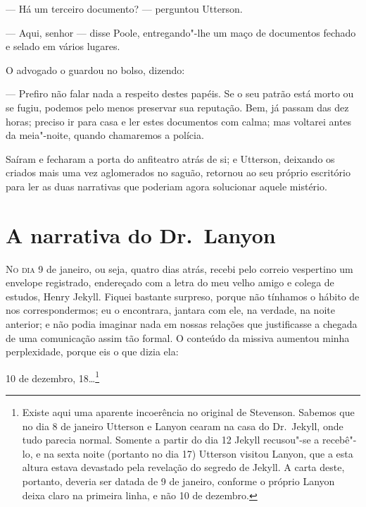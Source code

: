 --- Há um terceiro documento? --- perguntou Utterson. 

--- Aqui, senhor --- disse Poole, entregando"-lhe um maço de documentos
fechado e selado em vários lugares.

O advogado o guardou no bolso, dizendo:

--- Prefiro não falar nada a respeito destes papéis.  Se o seu patrão
está morto ou se fugiu, podemos pelo menos preservar sua reputação. 
Bem, já passam das dez horas; preciso ir para casa e ler estes
documentos com calma; mas voltarei antes da meia"-noite, quando
chamaremos a polícia.

Saíram e fecharam a porta do anfiteatro atrás de si; e Utterson,
deixando os criados mais uma vez aglomerados no saguão, retornou ao seu
próprio escritório para ler as duas narrativas que poderiam agora
solucionar aquele mistério.


\chapter[A narrativa do Dr.~Lanyon]{A narrativa do Dr.~Lanyon}

\textsc{No dia} 9 de janeiro, ou seja, quatro dias atrás, recebi pelo correio
vespertino um envelope registrado, endereçado com a letra do meu velho
amigo e colega de estudos, Henry Jekyll.  Fiquei bastante surpreso,
porque não tínhamos o hábito de nos correspondermos; eu o encontrara,
jantara com ele, na verdade, na noite anterior; e não podia imaginar
nada em nossas relações que justificasse a chegada de uma comunicação
assim tão formal.  O conteúdo da missiva aumentou minha perplexidade,
porque eis o que dizia ela:

10 de dezembro, 18\ldots{}\footnote{ Existe aqui uma aparente incoerência no original de Stevenson.  Sabemos
que no dia 8 de janeiro Utterson e Lanyon cearam na casa do Dr.~Jekyll,
onde tudo parecia normal.  Somente a partir do dia 12 Jekyll recusou"-se
a recebê"-lo, e na sexta noite (portanto no dia 17) Utterson visitou
Lanyon, que a esta altura estava devastado pela revelação do segredo
de Jekyll.  A carta deste, portanto, deveria ser datada de 9
de janeiro, conforme o próprio Lanyon deixa claro na primeira linha, e
não 10 de dezembro.}


